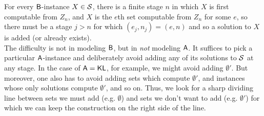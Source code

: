 \documentclass{amsart}
\begin{document}
	For every $\sf{B}$-instance $X\in \mathcal{S}$, there is a finite stage $n$ in which $X$ is first computable from $Z_n$, and $X$ is the $e$th set computable from $Z_n$ for some $e$, so there must be a stage $j>n$ for which $(e_j,n_j)=(e,n)$ and so a solution to $X$ is added (or already exists). \\
	
	The difficulty is not in modeling $\sf{B}$, but in \textit{not} modeling $\sf{A}$. It suffices to pick a particular $\sf{A}$-instance and deliberately avoid adding any of its solutions to $\mathcal{S}$ at any stage. In the case of $\sf{A}=\operatorname{\sf{KL}}$, for example, we might avoid adding $\emptyset'$. But moreover, one also has to avoid adding sets which compute $\emptyset'$, and instances whose only solutions compute $\emptyset'$, and so on. Thus, we look for a sharp dividing line between sets we must add (e.g. $\emptyset$) and sets we don't want to add (e.g. $\emptyset'$) for which we can keep the construction on the right side of the line.\\
	
	
	
	
	
	
	
\end{document}
